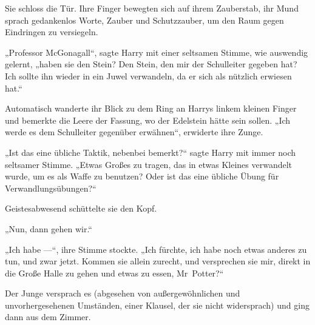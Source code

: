 Sie schloss die Tür.
Ihre Finger bewegten sich auf ihrem Zauberstab, ihr Mund sprach gedankenlos Worte, Zauber und Schutzzauber, um den Raum gegen Eindringen zu versiegeln.

„Professor McGonagall“, sagte Harry mit einer seltsamen Stimme, wie auswendig gelernt, „haben sie den Stein? Den Stein, den mir der Schulleiter gegeben hat? Ich sollte ihn wieder in ein Juwel verwandeln, da er sich als nützlich erwiesen hat.“

Automatisch wanderte ihr Blick zu dem Ring an Harrys linkem kleinen Finger und bemerkte die Leere der Fassung, wo der Edelstein hätte sein sollen.
„Ich werde es dem Schulleiter gegenüber erwähnen“, erwiderte ihre Zunge.

„Ist das eine übliche Taktik, nebenbei bemerkt?“ sagte Harry mit immer noch seltsamer Stimme.
„Etwas Großes zu tragen, das in etwas Kleines verwandelt wurde, um es als Waffe zu benutzen? Oder ist das eine übliche Übung für Verwandlungsübungen?“

Geistesabwesend schüttelte sie den Kopf.

„Nun, dann gehen wir.“

„Ich habe —“, ihre Stimme stockte.
„Ich fürchte, ich habe noch etwas anderes zu tun, und zwar jetzt. Kommen sie allein zurecht, und versprechen sie mir, direkt in die Große Halle zu gehen und etwas zu essen, Mr~Potter?“

Der Junge versprach es (abgesehen von außergewöhnlichen und unvorhergesehenen Umständen, einer Klausel, der sie nicht widersprach) und ging dann aus dem Zimmer.

